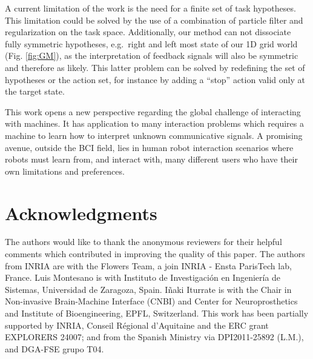 \documentclass[letterpaper]{article}
\begin{document}
A current limitation of the work is the need for a finite set of task hypotheses. This limitation could be solved by the use of a combination of particle filter and regularization on the task space. Additionally, our method can not dissociate fully symmetric hypotheses, e.g.\ right and left most state of our 1D grid world (Fig. \ref{fig:GM}), as the interpretation of feedback signals will also be symmetric and therefore as likely. This latter problem can be solved by redefining the set of hypotheses or the action set, for instance by adding a ``stop'' action valid only at the target state.

This work opens a new perspective regarding the global challenge of interacting with machines. It has application to many interaction problems which requires a machine to learn how to interpret unknown communicative signals. A promising avenue, outside the BCI field, lies in human robot interaction scenarios where robots must learn from, and interact with, many different users who have their own limitations and preferences.

\section{Acknowledgments}
The authors would like to thank the anonymous reviewers for their helpful comments which contributed in improving the quality of this paper. The authors from INRIA are with the Flowers Team, a join INRIA - Ensta ParisTech lab, France. Luis Montesano is with Instituto de Investigaci\'{o}n en Ingenier\'{i}a de Sistemas, Universidad de Zaragoza, Spain. I\~{n}aki Iturrate is with the Chair in Non-invasive Brain-Machine Interface (CNBI) and Center for Neuroprosthetics and Institute of Bioengineering, EPFL, Switzerland. This work has been partially supported by INRIA, Conseil R\'egional d'Aquitaine and the ERC grant EXPLORERS 24007; and from the Spanish Ministry via DPI2011-25892 (L.M.), and DGA-FSE grupo T04.

\begin{quote}
\begin{small}


\end{small}
\end{quote}
\end{document}
